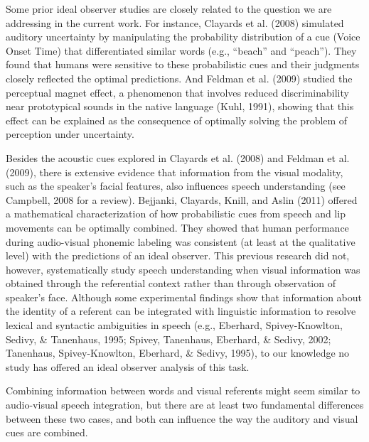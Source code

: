 \documentclass[english,,man,floatsintext]{apa6}
\theoremstyle{definition}
\theoremstyle{definition}
\theoremstyle{definition}
\theoremstyle{remark}
\begin{document}
Some prior ideal observer studies are closely related to the question we
are addressing in the current work. For instance, Clayards et al. (2008)
simulated auditory uncertainty by manipulating the probability
distribution of a cue (Voice Onset Time) that differentiated similar
words (e.g., \enquote{beach} and \enquote{peach}). They found that
humans were sensitive to these probabilistic cues and their judgments
closely reflected the optimal predictions. And Feldman et al. (2009)
studied the perceptual magnet effect, a phenomenon that involves reduced
discriminability near prototypical sounds in the native language (Kuhl,
1991), showing that this effect can be explained as the consequence of
optimally solving the problem of perception under uncertainty.

Besides the acoustic cues explored in Clayards et al. (2008) and Feldman
et al. (2009), there is extensive evidence that information from the
visual modality, such as the speaker's facial features, also influences
speech understanding (see Campbell, 2008 for a review). Bejjanki,
Clayards, Knill, and Aslin (2011) offered a mathematical
characterization of how probabilistic cues from speech and lip movements
can be optimally combined. They showed that human performance during
audio-visual phonemic labeling was consistent (at least at the
qualitative level) with the predictions of an ideal observer. This
previous research did not, however, systematically study speech
understanding when visual information was obtained through the
referential context rather than through observation of speaker's face.
Although some experimental findings show that information about the
identity of a referent can be integrated with linguistic information to
resolve lexical and syntactic ambiguities in speech (e.g., Eberhard,
Spivey-Knowlton, Sedivy, \& Tanenhaus, 1995; Spivey, Tanenhaus,
Eberhard, \& Sedivy, 2002; Tanenhaus, Spivey-Knowlton, Eberhard, \&
Sedivy, 1995), to our knowledge no study has offered an ideal observer
analysis of this task.

Combining information between words and visual referents might seem
similar to audio-visual speech integration, but there are at least two
fundamental differences between these two cases, and both can influence
the way the auditory and visual cues are combined.
\end{document}

